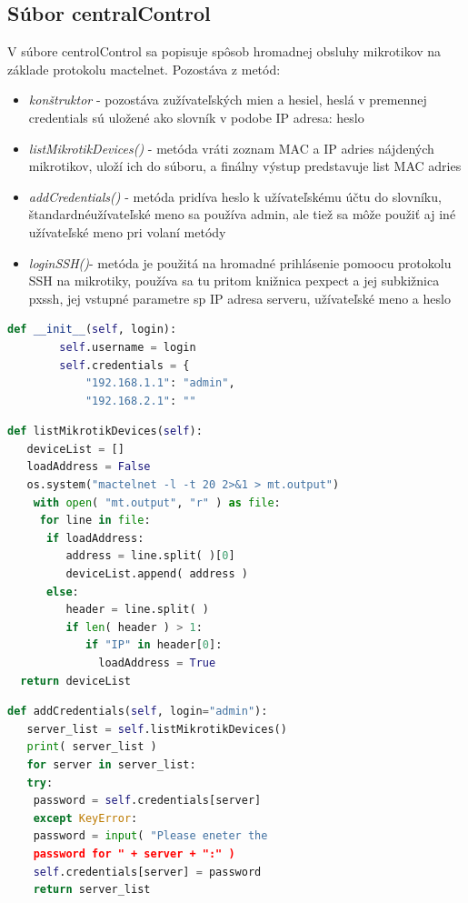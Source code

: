 \subsection{Súbor centralControl}
\label{sec:central}
V súbore centrolControl sa popisuje spôsob hromadnej obsluhy mikrotikov na základe protokolu mactelnet. Pozostáva z metód:
\begin{itemize}
\item \textit{konštruktor} - pozostáva zužívateľských mien a hesiel, heslá v premennej credentials sú uložené ako slovník v podobe IP adresa: heslo
\item \textit{listMikrotikDevices()} - metóda vráti zoznam MAC a IP adries nájdených mikrotikov, uloží ich do súboru, a finálny výstup predstavuje list MAC adries
\item \textit{addCredentials()} - metóda pridíva heslo k užívateľskému účtu do slovníku, štandardnéužívateľské meno sa používa admin, ale tiež sa môže použiť aj iné užívateľské meno pri volaní metódy
\item \textit{loginSSH()}- metóda je použitá na hromadné prihlásenie pomoocu protokolu SSH na mikrotiky, používa sa tu pritom knižnica pexpect a jej subkižnica pxssh, jej vstupné parametre sp IP adresa serveru, užívateľské meno a heslo 
\end{itemize}
\linebreak
\begin{lstlisting}[language=python, frame=single, caption=Deklarácia vstupných parametrov,captionpos=b]
 def __init__(self, login):
        self.username = login
        self.credentials = {
            "192.168.1.1": "admin",
            "192.168.2.1": ""
\end{lstlisting}
\begin{lstlisting}[language=python, frame=single, caption=Meóda zobrazenia mikrotikov,captionpos=b, showstringspaces=false]
 def listMikrotikDevices(self):
   deviceList = []
   loadAddress = False
   os.system("mactelnet -l -t 20 2>&1 > mt.output")
    with open( "mt.output", "r" ) as file:
     for line in file:
      if loadAddress:
         address = line.split( )[0]
         deviceList.append( address )
      else:
         header = line.split( )
         if len( header ) > 1:
            if "IP" in header[0]:
              loadAddress = True
  return deviceList
\end{lstlisting}
\newpage
\begin{lstlisting}[language=python, frame=single, caption=Metóda pridania užívateľských mien a hesiel,captionpos=b, showstringspaces=false]
 def addCredentials(self, login="admin"):
   server_list = self.listMikrotikDevices()
   print( server_list )
   for server in server_list:
   try:
    password = self.credentials[server]
    except KeyError:
    password = input( "Please eneter the 
    password for " + server + ":" )
    self.credentials[server] = password
    return server_list
\end{lstlisting}
